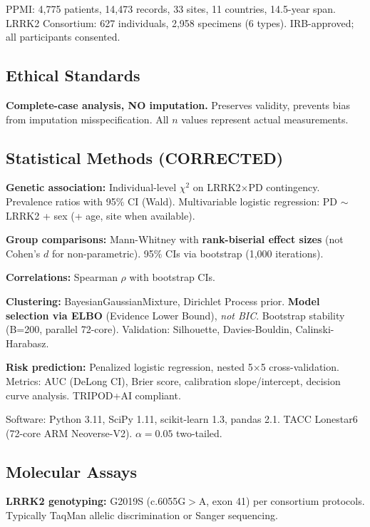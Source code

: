 \documentclass[11pt]{article}
\begin{document}
PPMI\cite{marek2018parkinson}: 4,775 patients, 14,473 records, 33 sites, 11 countries, 14.5-year span. LRRK2 Consortium\cite{marder2015age}: 627 individuals, 2,958 specimens (6 types). IRB-approved; all participants consented.

\subsection{Ethical Standards}

\textbf{Complete-case analysis, NO imputation.} Preserves validity, prevents bias from imputation misspecification. All $n$ values represent actual measurements.

\subsection{Statistical Methods (CORRECTED)}

\textbf{Genetic association:} Individual-level $\chi^2$ on LRRK2$\times$PD contingency. Prevalence ratios with 95\% CI (Wald). Multivariable logistic regression: PD $\sim$ LRRK2 + sex (+ age, site when available).

\textbf{Group comparisons:} Mann-Whitney with \textbf{rank-biserial effect sizes} (not Cohen's $d$ for non-parametric). 95\% CIs via bootstrap (1,000 iterations).

\textbf{Correlations:} Spearman $\rho$ with bootstrap CIs.

\textbf{Clustering:} BayesianGaussianMixture, Dirichlet Process prior. \textbf{Model selection via ELBO} (Evidence Lower Bound), \textit{not BIC}. Bootstrap stability (B=200, parallel 72-core). Validation: Silhouette, Davies-Bouldin, Calinski-Harabasz.

\textbf{Risk prediction:} Penalized logistic regression, nested 5$\times$5 cross-validation. Metrics: AUC (DeLong CI), Brier score, calibration slope/intercept, decision curve analysis. TRIPOD+AI compliant\cite{collins2024tripod}.

Software: Python 3.11, SciPy 1.11, scikit-learn 1.3, pandas 2.1. TACC Lonestar6 (72-core ARM Neoverse-V2). $\alpha=0.05$ two-tailed.

\subsection{Molecular Assays}

\textbf{LRRK2 genotyping:} G2019S (c.6055G$>$A, exon 41) per consortium protocols\cite{marder2015age}. Typically TaqMan allelic discrimination or Sanger sequencing.
\end{document}
